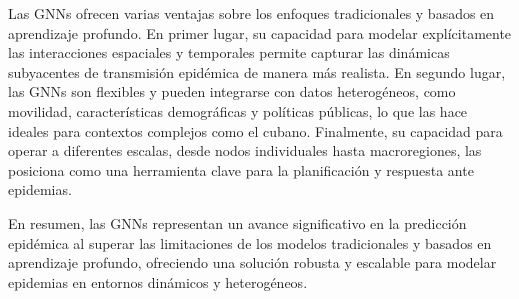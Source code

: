 Las GNNs ofrecen varias ventajas sobre los enfoques tradicionales y basados en aprendizaje profundo. En primer lugar, su capacidad para modelar explícitamente las interacciones espaciales y temporales permite capturar las dinámicas subyacentes de transmisión epidémica de manera más realista\parencite{Croft2023DutchSARS}. En segundo lugar, las GNNs son flexibles y pueden integrarse con datos heterogéneos, como movilidad, características demográficas y políticas públicas, lo que las hace ideales para contextos complejos como el cubano. Finalmente, su capacidad para operar a diferentes escalas, desde nodos individuales hasta macroregiones, las posiciona como una herramienta clave para la planificación y respuesta ante epidemias\parencite{Zheng2024HeatGNN, Nguyen2023NZSTGNN}.

En resumen, las GNNs representan un avance significativo en la predicción epidémica al superar las limitaciones de los modelos tradicionales y basados en aprendizaje profundo, ofreciendo una solución robusta y escalable para modelar epidemias en entornos dinámicos y heterogéneos.
